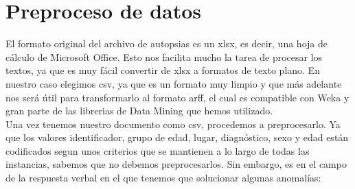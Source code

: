 \documentclass[10pt,a4paper,draft]{article}
\begin{document}
\section{Preproceso de datos}
El formato original del archivo de autopsias es un xlsx, es decir, una hoja de cálculo de Microsoft Office. Esto nos facilita mucho la tarea de procesar los textos, ya que es muy fácil convertir de xlsx a formatos de texto plano. En nuestro caso elegimos csv, ya que es un formato muy limpio y que más adelante nos será útil para transformarlo al formato arff, el cual es compatible con Weka y gran parte de las librerias de Data Mining que hemos utilizado.\\

Una vez tenemos nuestro documento como csv, procedemos a preprocesarlo. Ya que los valores identificador, grupo de edad, lugar, diagnóstico, sexo y edad están codificados segun unos criterios que se mantienen a lo largo de todas las instancias, sabemos que no debemos preprocesarlos. Sin embargo, es en el campo de la respuesta verbal en el que tenemos que solucionar algunas anomalías:
\end{document}
